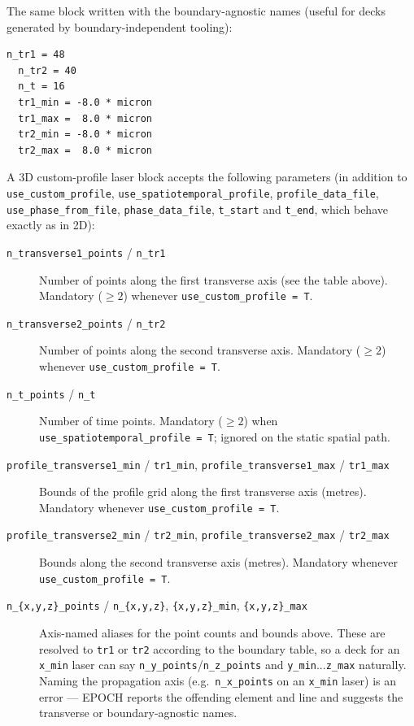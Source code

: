 \documentclass[11pt,a4paper]{article}
\begin{document}
The same block written with the boundary-agnostic names (useful for decks
generated by boundary-independent tooling):

\begin{lstlisting}[style=deck]
  n_tr1 = 48
  n_tr2 = 40
  n_t = 16
  tr1_min = -8.0 * micron
  tr1_max =  8.0 * micron
  tr2_min = -8.0 * micron
  tr2_max =  8.0 * micron
\end{lstlisting}

A 3D custom-profile laser block accepts the following parameters (in
addition to \texttt{use\_custom\_profile},
\texttt{use\_spatiotemporal\_profile}, \texttt{profile\_data\_file},
\texttt{use\_phase\_from\_file}, \texttt{phase\_data\_file},
\texttt{t\_start} and \texttt{t\_end}, which behave exactly as in 2D):

\begin{description}
  \item[\texttt{n\_transverse1\_points} / \texttt{n\_tr1}] Number of
    points along the first transverse axis (see the table above).
    Mandatory ($\geq 2$) whenever \texttt{use\_custom\_profile = T}.

  \item[\texttt{n\_transverse2\_points} / \texttt{n\_tr2}] Number of
    points along the second transverse axis. Mandatory ($\geq 2$)
    whenever \texttt{use\_custom\_profile = T}.

  \item[\texttt{n\_t\_points} / \texttt{n\_t}] Number of time points.
    Mandatory ($\geq 2$) when \texttt{use\_spatiotemporal\_profile = T};
    ignored on the static spatial path.

  \item[\texttt{profile\_transverse1\_min} / \texttt{tr1\_min},
    \texttt{profile\_transverse1\_max} / \texttt{tr1\_max}] Bounds of the
    profile grid along the first transverse axis (metres). Mandatory
    whenever \texttt{use\_custom\_profile = T}.

  \item[\texttt{profile\_transverse2\_min} / \texttt{tr2\_min},
    \texttt{profile\_transverse2\_max} / \texttt{tr2\_max}] Bounds along
    the second transverse axis (metres). Mandatory whenever
    \texttt{use\_custom\_profile = T}.

  \item[\texttt{n\_\{x,y,z\}\_points} / \texttt{n\_\{x,y,z\}},
    \texttt{\{x,y,z\}\_min}, \texttt{\{x,y,z\}\_max}] Axis-named aliases
    for the point counts and bounds above. These are resolved to
    \texttt{tr1} or \texttt{tr2} according to the boundary table, so a
    deck for an \texttt{x\_min} laser can say
    \texttt{n\_y\_points}/\texttt{n\_z\_points} and
    \texttt{y\_min}...\texttt{z\_max} naturally. Naming the propagation
    axis (e.g.\ \texttt{n\_x\_points} on an \texttt{x\_min} laser) is an
    error --- EPOCH reports the offending element and line and suggests
    the transverse or boundary-agnostic names.
\end{description}
\end{document}
